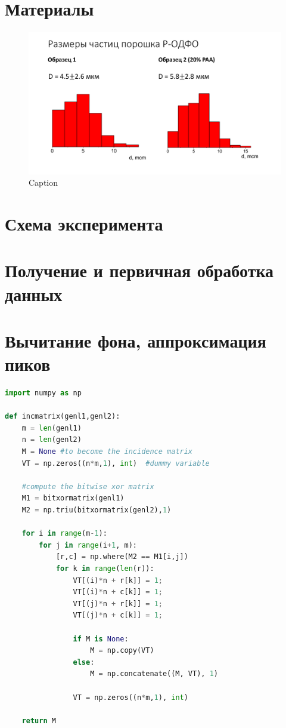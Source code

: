 

	\section{Материалы}
	
	
	\begin{figure}
	    \centering
	    \includegraphics[width=\linewidth]{fig/particles}
	    \caption{Caption}
	    \label{fig:my_label}
	\end{figure}
	
	\section{Схема эксперимента}
	
	\section{Получение и первичная обработка данных}
	
	\section{Вычитание фона, аппроксимация пиков}
	
	\begin{lstlisting}[language=Python, caption=Python example]
import numpy as np
 
def incmatrix(genl1,genl2):
    m = len(genl1)
    n = len(genl2)
    M = None #to become the incidence matrix
    VT = np.zeros((n*m,1), int)  #dummy variable
 
    #compute the bitwise xor matrix
    M1 = bitxormatrix(genl1)
    M2 = np.triu(bitxormatrix(genl2),1) 
 
    for i in range(m-1):
        for j in range(i+1, m):
            [r,c] = np.where(M2 == M1[i,j])
            for k in range(len(r)):
                VT[(i)*n + r[k]] = 1;
                VT[(i)*n + c[k]] = 1;
                VT[(j)*n + r[k]] = 1;
                VT[(j)*n + c[k]] = 1;
 
                if M is None:
                    M = np.copy(VT)
                else:
                    M = np.concatenate((M, VT), 1)
 
                VT = np.zeros((n*m,1), int)
 
    return M
\end{lstlisting}
	
